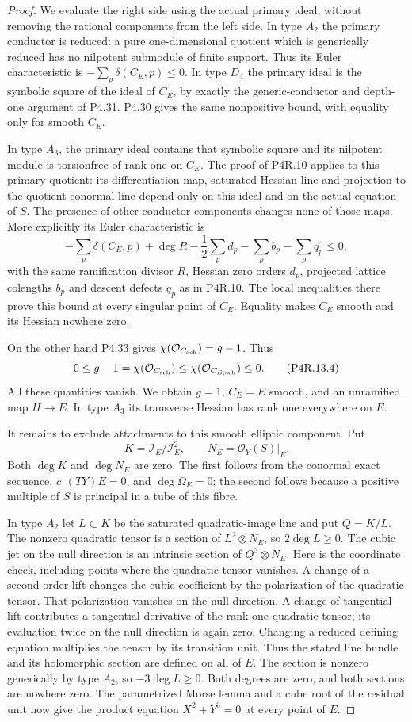 \begin{proof}
We evaluate the right side using the actual primary
ideal, without removing the rational components from
the left side. In type $A_2$ the primary conductor
is reduced: a pure one-dimensional quotient which
is generically reduced has no nilpotent submodule
of finite support. Thus its Euler characteristic
is $-\sum_p\delta(C_E,p)\le0$. In type $D_4$ the
primary ideal is the symbolic square of the ideal
of $C_E$, by exactly the generic-conductor and
depth-one argument of P4.31. P4.30 gives the same
nonpositive bound, with equality only for smooth
$C_E$.

In type $A_3$, the primary ideal contains that
symbolic square and its nilpotent module is
torsionfree of rank one on $C_E$. The proof of
P4R.10 applies to this primary quotient: its
differentiation map, saturated Hessian line and
projection to the quotient conormal line depend
only on this ideal and on the actual equation of
$S$. The presence of other conductor components
changes none of those maps. More explicitly its
Euler characteristic is
\[
 -\sum_p\delta(C_E,p)+\deg R
 -\frac12\sum_p d_p-\sum_p b_p-\sum_p q_p\le0,
\]
with the same ramification divisor $R$, Hessian
zero orders $d_p$, projected lattice colengths
$b_p$ and descent defects $q_p$ as in P4R.10.
The local inequalities there prove this bound
at every singular point of $C_E$. Equality
makes $C_E$ smooth and its Hessian nowhere zero.

On the other hand P4.33 gives
$\chi(\mathcal O_{C_{\rm sch}})=g-1$. Thus
\[
 0\le g-1
 =\chi(\mathcal O_{C_{\rm sch}})
 \le\chi(\mathcal O_{C_{E,\rm sch}})\le0.                    \tag{P4R.13.4}
\]
All these quantities vanish. We obtain $g=1$,
$C_E=E$ smooth, and an unramified map $H\to E$.
In type $A_3$ its transverse Hessian has rank
one everywhere on $E$.

It remains to exclude attachments to this smooth
elliptic component. Put
\[
 K=\mathcal I_E/\mathcal I_E^2,
 \qquad N_E=\mathcal O_Y(S)|_E.
\]
Both $\deg K$ and $\deg N_E$ are zero. The first
follows from the conormal exact sequence,
$c_1(TY)E=0$, and $\deg\Omega_E=0$; the second
follows because a positive multiple of $S$ is
principal in a tube of this fibre.

In type $A_2$ let $L\subset K$ be the saturated
quadratic-image line and put $Q=K/L$. The nonzero
quadratic tensor is a section of
$L^2\otimes N_E$, so $2\deg L\ge0$.
The cubic jet on the null direction is an
intrinsic section of $Q^3\otimes N_E$.
Here is the coordinate check, including points
where the quadratic tensor vanishes. A change
of a second-order lift changes the cubic
coefficient by the polarization of the
quadratic tensor. That polarization vanishes
on the null direction. A change of tangential
lift contributes a tangential derivative of
the rank-one quadratic tensor; its evaluation
twice on the null direction is again zero.
Changing a reduced defining equation multiplies
the tensor by its transition unit. Thus the
stated line bundle and its holomorphic section
are defined on all of $E$. The section is
nonzero generically by type $A_2$, so
$-3\deg L\ge0$. Both degrees are zero,
and both sections are nowhere zero. The
parametrized Morse lemma and a cube root
of the residual unit now give the product
equation $X^2+Y^3=0$ at every point of $E$.


\end{proof}
